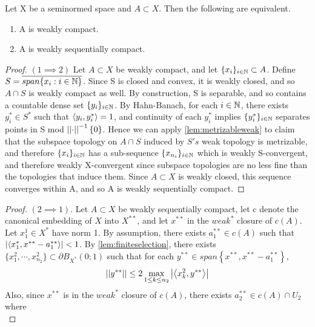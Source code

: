 \begin{thm}
    \label{thm:eberleinsmulian}
    Let X be a seminormed space and $A \subset X$. Then the following are equivalent. 
    \begin{enumerate}
        \item A is weakly compact.
        \item A is weakly sequentially compact.
    \end{enumerate}
    \begin{proof} $(1 \implies 2)$
        Let $A \subset X$ be weakly compact, and let $\{x_i\}_{i \in \mathbb{N}} \subset A$. Define $S=\overline{span\{x_i: i \in \mathbb{N}\}}$. Since S is closed and convex, it is weakly closed, and so $A \cap S$ is weakly compact as well. 
        By construction, S is separable, and so contains a countable dense set $\{y_i\}_{i \in \mathbb{N}}$. By Hahn-Banach, for each $i \in \mathbb{N}$, there exists $y_i^* \in S^*$ such that $\left\langle y_i,y_i^* \right\rangle=1$, and continuity of each $y_i^*$ implies $\{y_i^*\}_{i \in \mathbb{N}}$  separates points in S mod $\left|\left| \cdot \right|\right|^{-1}\{0\}$.
        Hence we can apply \ref{lem:metrizableweak} to claim that the subspace topology on $A \cap S$ induced by $S's$ weak topology is metrizable, and therefore $\{x_i\}_{i \in \mathbb{N}}$ has a sub-sequence $\{x_{n_i}\}_{i \in \mathbb{N}}$ which is weakly S-convergent, and therefore weakly X-convergent since subspace topologies are no less fine than the topologies that induce them. 
        Since $A \subset X$ is weakly closed, this sequence converges within A, and so A is weakly sequentially compact. 
    \end{proof}
    \begin{proof} $(2 \implies 1)$. 
        Let $A \subset X$ be weakly sequentially compact, let c denote the canonical embedding of $X$ into $X^{**}$, and let $x^{**}$ in the $weak^*$ closure of $c(A)$. Let $x_1^1 \in X^*$ have norm 1. By assumption, there exists $a_1^{**} \in c(A)$ such that $\left| \left\langle x_1^*,x^{**}-a_1^{**} \right\rangle \right| < 1$. 
        By \ref{lem:finiteselection}, there exists $\{x_1^2,\cdots,x_{n_2}^2\} \subset \partial B_{X^*}(0;1)$ such that for each $y^{**} \in span\left\{x^{**},x^{**}-a_1^{**}\right\}$, 
        \begin{equation}
            \left|\left| y^{**} \right|\right| \leq 2 \max\limits_{1 \leq k \leq n_2} \left| \left\langle x_k^2,y^{**} \right\rangle \right|
        \end{equation}
        Also, since $x^{**}$ is in the $weak^*$ closure of $c(A)$, there exists $a_2^{**} \in c(A) \cap U_2$ where
        \begin{equation}

\end{equation}
\end{proof}
\end{thm}
